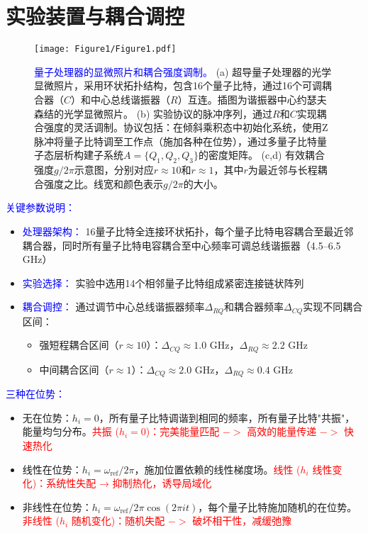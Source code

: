 \documentclass[11pt,a4paper]{article}
\begin{document}
\section{实验装置与耦合调控}

\begin{figure}[H]
    \centering
    \texttt{[image: Figure1/Figure1.pdf]}
    \caption{
        \textcolor{blue}{量子处理器的显微照片和耦合强度调制。}
        (a) 超导量子处理器的光学显微照片，采用环状拓扑结构，包含16个量子比特，通过16个可调耦合器（$C$）和中心总线谐振器（$R$）互连。插图为谐振器中心约瑟夫森结的光学显微照片。
        (b) 实验协议的脉冲序列，通过$R$和$C$实现耦合强度的灵活调制。协议包括：在倾斜乘积态中初始化系统，使用Z脉冲将量子比特调至工作点（施加各种在位势），通过多量子比特量子态层析构建子系统$A=\{Q_1,Q_2,Q_3\}$的密度矩阵。
        (c,d) 有效耦合强度$g/2\pi$示意图，分别对应$r\approx 10$和$r\approx 1$，其中$r$为最近邻与长程耦合强度之比。线宽和颜色表示$g/2\pi$的大小。
    }
    \label{fig:device_and_coupling}
\end{figure}

\textcolor{blue}{关键参数说明：}
\begin{itemize}
    \item \textcolor{blue}{处理器架构：} 16量子比特全连接环状拓扑，每个量子比特电容耦合至最近邻耦合器，同时所有量子比特电容耦合至中心频率可调总线谐振器（4.5–6.5 GHz）
    \item \textcolor{blue}{实验选择：} 实验中选用14个相邻量子比特组成紧密连接链状阵列
    \item \textcolor{blue}{耦合调控：} 通过调节中心总线谐振器频率$\Delta_{RQ}$和耦合器频率$\Delta_{CQ}$实现不同耦合区间：
    \begin{itemize}
        \item 强短程耦合区间（$r\approx 10$）：$\Delta_{CQ}\approx 1.0$ GHz，$\Delta_{RQ}\approx 2.2$ GHz
        \item 中间耦合区间（$r\approx 1$）：$\Delta_{CQ}\approx 2.0$ GHz，$\Delta_{RQ}\approx 0.4$ GHz
    \end{itemize}
\end{itemize}

\textcolor{blue}{三种在位势：}
\begin{itemize}
    \item 无在位势：$h_i = 0$，所有量子比特调谐到相同的频率，所有量子比特"共振"，能量均匀分布。\textcolor{red}{共振 ($h_i=0$)：完美能量匹配 $->$ 高效的能量传递 $->$ 快速热化}
    \item 线性在位势：$h_i = \omega_{\text{ref}}/2\pi$，施加位置依赖的线性梯度场。\textcolor{red}{线性 ($h_i$ 线性变化)：系统性失配 → 抑制热化，诱导局域化}
    \item 非线性在位势：$h_i = \omega_{\text{ref}}/2\pi \cos(2\pi i t)$，每个量子比特施加随机的在位势。\textcolor{red}{非线性 ($h_i$ 随机变化)：随机失配 $->$ 破坏相干性，减缓弛豫}
\end{itemize}
\end{document}
